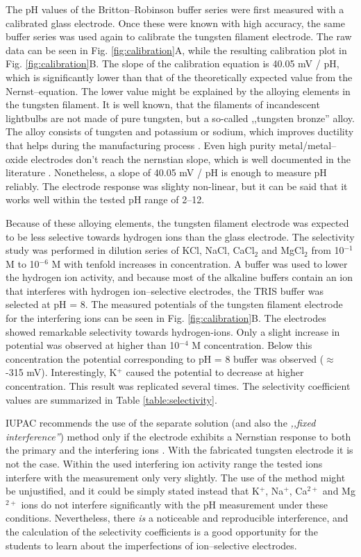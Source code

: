 \documentclass[manuscript=article, journal=jceda8]{achemso}
\begin{document}
The pH values of the Britton--Robinson buffer series were first measured with a calibrated glass electrode. Once these were known with high accuracy, the same buffer series was used again to calibrate the tungsten filament electrode. The raw data can be seen in Fig. \ref{fig:calibration}A, while the resulting calibration plot in Fig. \ref{fig:calibration}B. The slope of the calibration equation is 40.05 mV / pH, which is significantly lower than that of the theoretically expected value from the Nernst--equation. The lower value might be explained by the alloying elements in the tungsten filament. It is well known, that the filaments of incandescent lightbulbs are not made of pure tungsten, but a so-called ,,tungsten bronze'' alloy. The alloy consists of tungsten and potassium or sodium, which improves ductility that helps during the manufacturing process \cite{cisternas2015electrode, wechter1972use, schade2010100}. Even high purity metal/metal--oxide electrodes don't reach the nernstian slope, which is well documented in the literature \cite{kriksunov1994tungsten, midgley1990review}. Nonetheless, a slope of 40.05 mV / pH is enough to measure pH reliably. The electrode response was slighty non-linear, but it can be said that it works well within the tested pH range of 2--12.

Because of these alloying elements, the tungsten filament electrode was expected to be less selective towards hydrogen ions than the glass electrode. The selectivity study was performed in dilution series of KCl, NaCl, CaCl$_2$ and MgCl$_2$ from 10$^{-1}$ M to 10$^{-6}$ M with tenfold increases in concentration. A buffer was used to lower the hydrogen ion activity, and because most of the alkaline buffers contain an ion that interferes with hydrogen ion--selective electrodes, the TRIS buffer was selected at pH = 8.
The measured potentials of the tungsten filament electrode for the interfering ions can be seen in Fig. \ref{fig:calibration}B. The electrodes showed remarkable selectivity towards hydrogen-ions. Only a slight increase in potential was observed at higher than 10$^{-4}$ M concentration. Below this concentration the potential corresponding to pH = 8 buffer was observed ($\approx$ -315 mV). Interestingly, K$^+$ caused the potential to decrease at higher concentration. This result was replicated several times. The selectivity coefficient values are summarized in Table \ref{table:selectivity}.

IUPAC recommends the use of the separate solution (and also the \emph{,,fixed interference''}) method only if the electrode exhibits a Nernstian response to both the primary and the interfering ions \cite{buck1994recommendations}. With the fabricated tungsten electrode it is not the case. Within the used interfering ion activity range the tested ions interfere with the measurement only very slightly. The use of the method might be unjustified, and it could be simply stated instead that K$^+$, Na$^+$, Ca$^{2+}$ and Mg$^{2+}$ ions do not interfere significantly with the pH measurement under these conditions. Nevertheless, there \emph{is} a noticeable and reproducible interference, and the calculation of the selectivity coefficients is a good opportunity for the students to learn about the imperfections of ion--selective electrodes.
\end{document}
